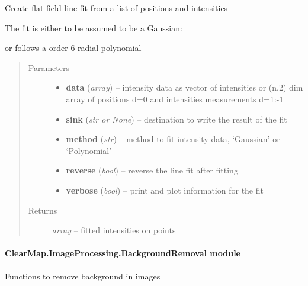 \documentclass[letterpaper,10pt,english]{sphinxmanual}
\begin{document}

\begin{fulllineitems}
\label{api/ClearMap.ImageProcessing:ClearMap.ImageProcessing.IlluminationCorrection.flatfieldLineFromRegression}
Create flat field line fit from a list of positions and intensities

The fit is either to be assumed to be a Gaussian:

or follows a order 6 radial polynomial
\begin{quote}\begin{description}
\item[{Parameters}] \leavevmode\begin{itemize}
\item {} 
\textbf{data} (\emph{array}) --
intensity data as vector of intensities or (n,2) dim array of positions d=0 and intensities measurements d=1:-1

\item {} 
\textbf{sink} (\emph{str or None}) --
destination to write the result of the fit

\item {} 
\textbf{method} (\emph{str}) --
method to fit intensity data, `Gaussian' or `Polynomial'

\item {} 
\textbf{reverse} (\emph{bool}) --
reverse the line fit after fitting

\item {} 
\textbf{verbose} (\emph{bool}) --
print and plot information for the fit

\end{itemize}

\item[{Returns}] \leavevmode
\emph{array} --
fitted intensities on points

\end{description}\end{quote}

\end{fulllineitems}



\paragraph{ClearMap.ImageProcessing.BackgroundRemoval module}
\label{api/ClearMap.ImageProcessing:module-ClearMap.ImageProcessing.BackgroundRemoval}\label{api/ClearMap.ImageProcessing:clearmap-imageprocessing-backgroundremoval-module}
Functions to remove background in images
\end{document}
